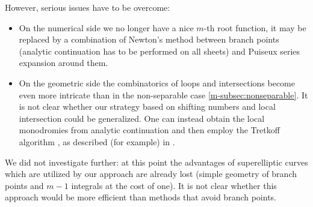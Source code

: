 \documentclass[main.tex]{subfiles}
\begin{document}
  However, serious issues have to be overcome:
  \begin{itemize}
      \item On the numerical side we no longer have a nice $m$-th root function,
          it may be replaced by a combination of Newton's method between branch
          points (analytic continuation has to
          be performed on all sheets) and
          Puiseux series expansion around them.
      \item On the geometric side the combinatorics of loops and intersections
          become even more intricate than in the non-separable case \ref{m-subsec:nonseparable}.
          It is not clear whether our strategy
          based on shifting numbers and local intersection could be generalized.
          One can instead obtain the local monodromies from analytic continuation  
          and then employ the Tretkoff algorithm \cite{TT1984}, as described (for example) in \cite{FrauendienerKlein2016}.
  \end{itemize}
  We did not investigate further: at this point the advantages
  of superelliptic curves which are utilized by our approach are already lost
  (simple geometry of branch points and $m-1$ integrals at the cost of one).
  It is not clear whether this approach would
  be more efficient than methods that avoid branch points.

  \biblio
  
\end{document}

